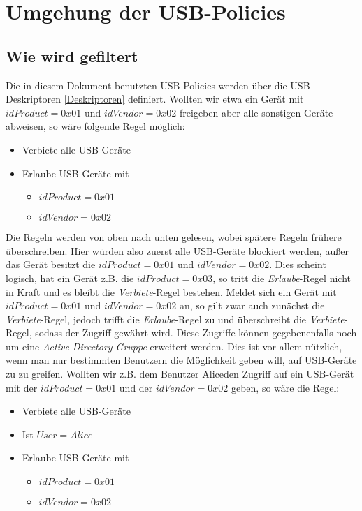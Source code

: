 \chapter{Umgehung der USB-Policies}\label{Angriff}

\section{Wie wird gefiltert}
Die in diesem Dokument benutzten USB-Policies werden über die USB-Deskriptoren \ref{Deskriptoren} definiert. Wollten wir etwa ein Gerät mit $idProduct=0x01$ und $idVendor=0x02$ freigeben aber alle sonstigen Geräte abweisen, so wäre folgende Regel möglich:
			\begin{itemize}
				\item Verbiete alle USB-Geräte
				\item Erlaube USB-Geräte mit
				\begin{itemize}
					\item $idProduct=0x01$
					\item $idVendor=0x02$
				\end{itemize}
			\end{itemize}
Die Regeln werden von oben nach unten gelesen, wobei spätere Regeln frühere überschreiben. Hier würden also zuerst alle USB-Geräte blockiert werden, außer das Gerät besitzt die $idProduct=0x01$ und $idVendor=0x02$. Dies scheint logisch, hat ein Gerät z.B. die $idProduct=0x03$, so tritt die \textit{Erlaube}-Regel nicht in Kraft und es bleibt die \textit{Verbiete}-Regel bestehen. Meldet sich ein Gerät mit $idProduct=0x01$ und $idVendor=0x02$ an, so gilt zwar auch zunächst die \textit{Verbiete}-Regel, jedoch trifft die \textit{Erlaube}-Regel zu und überschreibt die \textit{Verbiete}-Regel, sodass der Zugriff gewährt wird.
Diese Zugriffe können gegebenenfalls noch um eine \textit{Active-Directory-Gruppe} erweitert werden. Dies ist vor allem nützlich, wenn man nur bestimmten Benutzern die Möglichkeit geben will, auf USB-Geräte zu zu greifen. Wollten wir z.B. dem Benutzer \glqq Alice\grqq den Zugriff auf ein USB-Gerät mit der $idProduct=0x01$ und der $idVendor=0x02$ geben, so wäre die Regel:
			\begin{itemize}
				\item Verbiete alle USB-Geräte
				\item Ist $User=Alice$
				\item Erlaube USB-Geräte mit
				\begin{itemize}
					\item $idProduct=0x01$
					\item $idVendor=0x02$
				\end{itemize} 
			\end{itemize}

